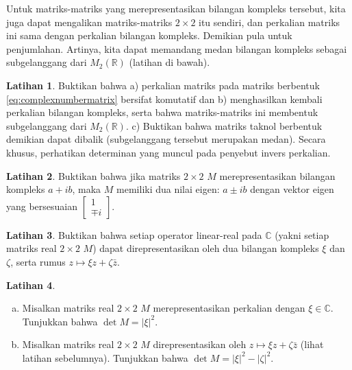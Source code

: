 \documentclass[12pt,openany]{book}
\newcommand{\sabs}[1]{\lvert {#1} \rvert}
\newcommand{\C}{{\mathbb{C}}}
\newcommand{\R}{{\mathbb{R}}}
\theoremstyle{plain}
\theoremstyle{remark}
\theoremstyle{definition}
\newenvironment{exbox}{%
    \def\FrameCommand{\vrule width 1pt \relax\hspace{10pt}}%
    \MakeFramed{\advance\hsize-\width\FrameRestore}%
}{%
    \endMakeFramed
}
\newenvironment{exparts}{%
    \leavevmode\begin{enumerate}[a),noitemsep,topsep=0pt,parsep=0pt,partopsep=0pt]
}{%
    \end{enumerate}
}
\theoremstyle{exercise}
\newtheorem{exercise}{Latihan}[section]
\theoremstyle{example}
\begin{document}
Untuk matriks-matriks yang merepresentasikan bilangan kompleks tersebut,
kita juga dapat mengalikan matriks-matriks $2 \times 2$ itu sendiri,
dan perkalian matriks ini sama dengan perkalian bilangan
kompleks.  Demikian pula untuk penjumlahan.
Artinya, kita dapat memandang medan bilangan kompleks sebagai subgelanggang dari $M_2(\R)$
(latihan di bawah).

\begin{exbox}
\begin{exercise}
Buktikan bahwa a) perkalian matriks pada matriks berbentuk
\eqref{eq:complexnumbermatrix}
bersifat komutatif dan b) menghasilkan kembali perkalian
bilangan kompleks, serta bahwa matriks-matriks ini membentuk subgelanggang dari $M_2(\R)$.
c) Buktikan bahwa matriks taknol berbentuk demikian
dapat dibalik (subgelanggang tersebut merupakan medan).  Secara khusus, perhatikan
determinan yang muncul pada penyebut invers perkalian.
\end{exercise}

\begin{exercise}
Buktikan bahwa jika matriks $2 \times 2$ $M$ merepresentasikan bilangan kompleks
$a+ib$, maka $M$ memiliki dua nilai eigen: $a \pm i b$ dengan vektor eigen yang bersesuaian
$\left[ \begin{smallmatrix} 1 \\ \mp i \end{smallmatrix}
\right]$.
\end{exercise}

\begin{exercise} \label{exercise:reallinmap}
Buktikan bahwa setiap operator linear-real pada $\C$ (yakni setiap
matriks real $2 \times 2$ $M$) dapat direpresentasikan
oleh dua bilangan kompleks $\xi$ dan $\zeta$, serta rumus
$z \mapsto \xi z + \zeta \bar{z}$.
\end{exercise}

\begin{exercise}
\begin{exparts}
\item
Misalkan matriks real $2 \times 2$ $M$ merepresentasikan perkalian dengan $\xi \in \C$.
Tunjukkan bahwa $\det M = \sabs{\xi}^2$.
\item
Misalkan matriks real $2 \times 2$ $M$ direpresentasikan oleh $z \mapsto \xi z + \zeta
\bar{z}$ (lihat latihan sebelumnya).
Tunjukkan bahwa $\det M = \sabs{\xi}^2 - \sabs{\zeta}^2$.
\end{exparts}
\end{exercise}
\end{exbox}
\end{document}
